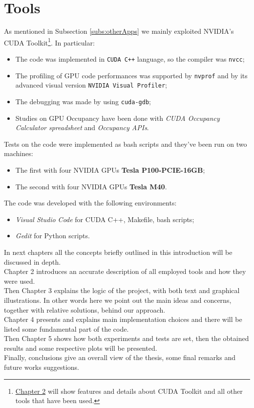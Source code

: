 \section{Tools}
\label{sect:tools}
	As mentioned in Subsection \ref{subs:otherApps} we mainly exploited NVIDIA's CUDA Toolkit\footnote{\hyperref[chap:tools]{Chapter 2} will show features and details about CUDA Toolkit and all other tools that have been used.}.
	In particular:
	\begin{itemize}
		\item The code was implemented in \texttt{CUDA C++} language, so the compiler was \texttt{nvcc};	
			
		\item The profiling of GPU code performances was supported by \texttt{nvprof} and by its advanced visual version \texttt{NVIDIA Visual Profiler};
				
		\item The debugging was made by using \texttt{cuda-gdb};
				
		\item Studies on GPU Occupancy have been done with \textit{CUDA Occupancy Calculator spreadsheet} and \textit{Occupancy APIs}.
	\end{itemize}
	Tests on the code were implemented as bash scripts and they've been run on two machines:	
	\begin{itemize}
		\item The first with four NVIDIA GPUs \textbf{Tesla P100-PCIE-16GB};
		
		\item The second with four NVIDIA GPUs \textbf{Tesla M40}.
	\end{itemize}
	The code was developed with the following environments:
	\begin{itemize}
		\item \textit{Visual Studio Code} for CUDA C++, Makefile, bash scripts;
		\item \textit{Gedit} for Python scripts.\\
	\end{itemize}
		
In next chapters all the concepts briefly outlined in this introduction will be discussed in depth.\\
Chapter 2 introduces an accurate description of all employed tools and how they were used.\\
Then Chapter 3 explains the logic of the project, with both text and graphical illustrations. In other words here we point out the main ideas and concerns, together with relative solutions, behind our approach.\\
Chapter 4 presents and explains main implementation choices and there will be listed some fundamental part of the code.\\ 
Then Chapter 5 shows how both experiments and tests are set, then the obtained results and some respective plots will be presented.\\
Finally, conclusions give an overall view of the thesis, some final remarks and future works suggestions. 
